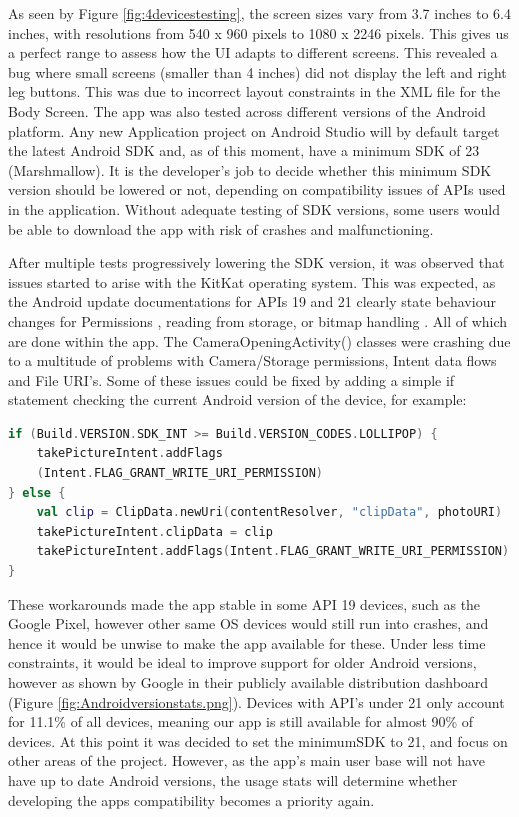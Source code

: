 As seen by Figure \ref{fig:4devicestesting}, the screen sizes vary from 3.7 inches to 6.4 inches, with resolutions from 540 x 960 pixels to 1080 x 2246 pixels. This gives us a perfect range to assess how the UI adapts to different screens. This revealed a bug where small screens (smaller than 4 inches) did not display the left and right leg buttons. This was due to incorrect layout constraints in the XML file for the Body Screen. The app was also tested across different versions of the Android platform. Any new Application project on Android Studio will by default target the latest Android SDK and, as of this moment, have a minimum SDK of 23 (Marshmallow). It is the developer's job to decide whether this minimum SDK version should be lowered or not, depending on compatibility issues of APIs used in the application. Without adequate testing of SDK versions, some users would be able to download the app with risk of crashes and malfunctioning.
\par After multiple tests progressively lowering the SDK version, it was observed that issues started to arise with the KitKat operating system. This was expected, as the Android update documentations for APIs 19 and 21 clearly state behaviour changes for Permissions \cite{androiddevelopers}, reading from storage, or bitmap handling \cite{androiddevelopers2} . All of which are done within the app. The CameraOpeningActivity() classes were crashing due to a multitude of problems with Camera/Storage permissions, Intent data flows and File URI's. Some of these issues could be fixed by adding a simple if statement checking the current Android version of the device, for example:
\begin{lstlisting}[caption={Checking the Android Build Version}, label={lst:checkAndroidVersion}, language=Kotlin]
if (Build.VERSION.SDK_INT >= Build.VERSION_CODES.LOLLIPOP) {
    takePictureIntent.addFlags
    (Intent.FLAG_GRANT_WRITE_URI_PERMISSION)
} else {
    val clip = ClipData.newUri(contentResolver, "clipData", photoURI)
    takePictureIntent.clipData = clip
    takePictureIntent.addFlags(Intent.FLAG_GRANT_WRITE_URI_PERMISSION)
}
\end{lstlisting}
These workarounds made the app stable in some API 19 devices, such as the Google Pixel, however other same OS devices would still run into crashes, and hence it would be unwise to make the app available for these. Under less time constraints, it would be ideal to improve support for older Android versions, however as shown by Google in their publicly available distribution dashboard (Figure \ref{fig:Androidversionstats.png}). Devices with API's under 21 only account for 11.1\% of all devices, meaning our app is still available for almost 90\% of devices. At this point it was decided to set the minimumSDK to 21, and focus on other areas of the project. However, as the app's main user base will not have have up to date Android versions, the usage stats will determine whether developing the apps compatibility becomes a priority again.
